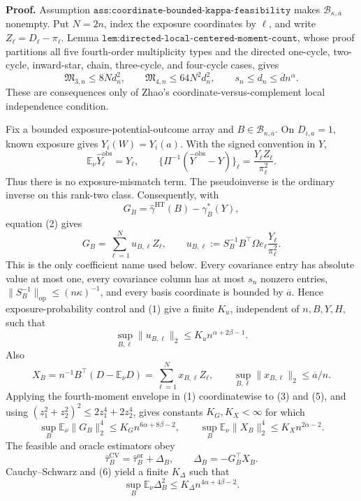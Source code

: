 \textbf{Proof.}
Assumption \(\texttt{ass:coordinate-bounded-kappa-feasibility}\) makes \(\mathcal B_{\kappa,\overline a}\) nonempty.  Put \(N=2n\), index the exposure coordinates by \(\ell\), and write \(Z_\ell=D_\ell-\pi_\ell\).  Lemma \(\texttt{lem:directed-local-centered-moment-count}\), whose proof partitions all five fourth-order multiplicity types and the directed one-cycle, two-cycle, inward-star, chain, three-cycle, and four-cycle cases, gives
\[
\mathfrak M_{3,n}\le8N d_n^2,
\qquad
\mathfrak M_{4,n}\le64N^2d_n^2,
\qquad
s_n\le d_n\le\overline d n^\alpha.
\tag{1}
\]
These are consequences only of Zhao's coordinate-versus-complement local independence condition.

Fix a bounded exposure-potential-outcome array and \(B\in\mathcal B_{\kappa,\overline a}\).  On \(D_{i,a}=1\), known exposure gives \(Y_i(W)=Y_i(a)\).  With the signed convention in \(Y\),
\[
\mathbb E_\nu\widehat Y_\ell^{\mathrm{obs}}=Y_\ell,
\qquad
\{\Pi^{-1}(\widehat Y^{\mathrm{obs}}-Y)\}_\ell
=\frac{Y_\ell Z_\ell}{\pi_\ell^2}.
\tag{2}
\]
Thus there is no exposure-mismatch term.  The pseudoinverse is the ordinary inverse on this rank-two class.  Consequently, with
\[
G_B=\widehat\gamma^{\mathrm{HT}}(B)-\gamma_B^*(Y),
\]
equation (2) gives
\[
G_B=\sum_{\ell=1}^{N}u_{B,\ell}Z_\ell,
\qquad
u_{B,\ell}:=S_B^{-1}B^\top\Omega e_\ell\frac{Y_\ell}{\pi_\ell^2}.
\tag{3}
\]
This is the only coefficient name used below.  Every covariance entry has absolute value at most one, every covariance column has at most \(s_n\) nonzero entries, \(\lVert S_B^{-1}\rVert_{\mathrm{op}}\le(n\kappa)^{-1}\), and every basis coordinate is bounded by \(\overline a\).  Hence exposure-probability control and (1) give a finite \(K_u\), independent of \(n,B,Y,H\), such that
\[
\sup_{B,\ell}\lVert u_{B,\ell}\rVert_2
\le K_u n^{\alpha+2\beta-1}.
\tag{4}
\]
Also
\[
X_B=n^{-1}B^\top(D-\mathbb E_\nu D)
=\sum_{\ell=1}^{N}x_{B,\ell}Z_\ell,
\qquad
\sup_{B,\ell}\lVert x_{B,\ell}\rVert_2\le\overline a/n.
\tag{5}
\]
Applying the fourth-moment envelope in (1) coordinatewise to (3) and (5), and using \((z_1^2+z_2^2)^2\le2z_1^4+2z_2^4\), gives constants \(K_G,K_X<\infty\) for which
\[
\sup_B\mathbb E_\nu\lVert G_B\rVert_2^4
\le K_Gn^{6\alpha+8\beta-2},
\qquad
\sup_B\mathbb E_\nu\lVert X_B\rVert_2^4
\le K_Xn^{2\alpha-2}.
\tag{6}
\]
The feasible and oracle estimators obey
\[
\widehat\tau_B^{\mathrm{CV}}=\widehat\tau_B^{\mathrm{or}}+\Delta_B,
\qquad \Delta_B=-G_B^\top X_B.
\tag{7}
\]
Cauchy--Schwarz and (6) yield a finite \(K_\Delta\) such that
\[
\sup_B\mathbb E_\nu\Delta_B^2
\le K_\Delta n^{4\alpha+4\beta-2}.
\tag{8}
\]

